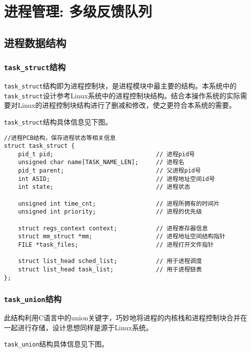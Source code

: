 \section{进程管理: 多级反馈队列}

\subsection{进程数据结构}

\subsubsection{\texttt{task\_struct}结构}

\texttt{task\_struct}结构即为进程控制块，是进程模块中最主要的结构。本系统中的\texttt{task\_struct}设计参考Linux系统中的进程控制块结构。结合本操作系统的实际需要对Linux的进程控制块结构进行了删减和修改，使之更符合本系统的需要。

\texttt{task\_struct}结构具体信息见下图。

\begin{lstlisting}[caption=\texttt{task\_struct}结构]
//进程PCB结构，保存进程状态等相关信息
struct task_struct {
    pid_t pid;                             // 进程pid号
    unsigned char name[TASK_NAME_LEN];     // 进程名
    pid_t parent;                          // 父进程pid号
    int ASID;                              // 进程地址空间id号
    int state;                             // 进程状态

    unsigned int time_cnt;                 // 进程所拥有的时间片
    unsigned int priority;                 // 进程的优先级  

    struct regs_context context;           // 进程寄存器信息
    struct mm_struct *mm;                  // 进程地址空间结构指针
    FILE *task_files;                      // 进程打开文件指针

    struct list_head sched_list;           // 用于进程调度
    struct list_head task_list;            // 用于进程链表
};
\end{lstlisting}

\newpage
\subsubsection{\texttt{task\_union}结构}

此结构利用C语言中的union关键字，巧妙地将进程的内核栈和进程控制块合并在一起进行存储，设计思想同样是源于Linux系统。

\texttt{task\_union}结构具体信息见下图。


